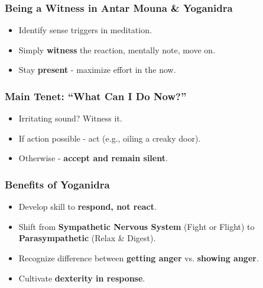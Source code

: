 \begin{frame}[fragile]\frametitle{Being a Witness in Antar Mouna \& Yoganidra}
      \begin{itemize}
      \item Identify sense triggers in meditation.
      \item Simply \textbf{witness} the reaction, mentally note, move on.
      \item Stay \textbf{present} - maximize effort in the now.
      \end{itemize}
\end{frame}

\begin{frame}[fragile]\frametitle{Main Tenet: “What Can I Do Now?”}
      \begin{itemize}
      \item Irritating sound? Witness it.
      \item If action possible - act (e.g., oiling a creaky door).
      \item Otherwise - \textbf{accept and remain silent}.
      \end{itemize}
\end{frame}

\begin{frame}[fragile]\frametitle{Benefits of Yoganidra}
      \begin{itemize}
      \item Develop skill to \textbf{respond, not react}.
      \item Shift from \textbf{Sympathetic Nervous System} (Fight or Flight) to \textbf{Parasympathetic} (Relax \& Digest).
      \item Recognize difference between \textbf{getting anger} vs. \textbf{showing anger}.
      \item Cultivate \textbf{dexterity in response}.
      \end{itemize}
\end{frame}



